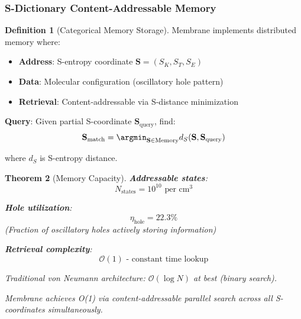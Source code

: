 \documentclass[11pt,a4paper]{article}
\newtheorem{theorem}{Theorem}[section]
\theoremstyle{definition}
\newtheorem{definition}[theorem]{Definition}
\theoremstyle{remark}
\begin{document}
\subsubsection{S-Dictionary Content-Addressable Memory}

\begin{definition}[Categorical Memory Storage]
Membrane implements distributed memory where:
\begin{itemize}
\item \textbf{Address}: S-entropy coordinate $\mathbf{S} = (S_K, S_T, S_E)$
\item \textbf{Data}: Molecular configuration (oscillatory hole pattern)
\item \textbf{Retrieval}: Content-addressable via S-distance minimization
\end{itemize}

\textbf{Query}: Given partial S-coordinate $\mathbf{S}_{\text{query}}$, find:
\begin{equation}
\mathbf{S}_{\text{match}} = \argmin_{\mathbf{S} \in \text{Memory}} d_S(\mathbf{S}, \mathbf{S}_{\text{query}})
\end{equation}

where $d_S$ is S-entropy distance.
\end{definition}

\begin{theorem}[Memory Capacity]
\textbf{Addressable states}:
\begin{equation}
N_{\text{states}} = 10^{10} \text{ per cm}^3
\end{equation}

\textbf{Hole utilization}:
\begin{equation}
\eta_{\text{hole}} = 22.3\%
\end{equation}
(Fraction of oscillatory holes actively storing information)

\textbf{Retrieval complexity}:
\begin{equation}
\mathcal{O}(1) \text{ - constant time lookup}
\end{equation}

Traditional von Neumann architecture: $\mathcal{O}(\log N)$ at best (binary search).

Membrane achieves O(1) via content-addressable parallel search across all S-coordinates simultaneously.
\end{theorem}
\end{document}
